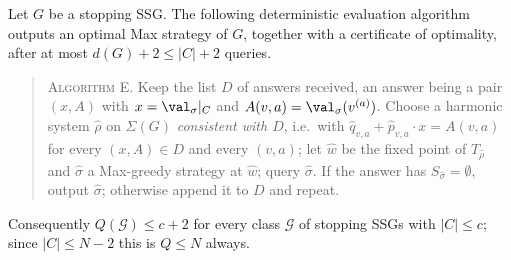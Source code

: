 \begin{theorem}\label{thm:qm-eval}
Let $G$ be a stopping SSG.  The following deterministic evaluation
algorithm outputs an optimal Max strategy of $G$, together with a
certificate of optimality, after at most $d(G)+2\le|C|+2$ queries.
\begin{quote}
\textsc{Algorithm E}.  Keep the list $D$ of answers received, an answer
being a pair $(x,A)$ with $x=\val_\sigma|_C$ and $A(v,a)=\val_\sigma(v^{(a)})$.
Choose a harmonic system $\hat\rho$ on $\Sigma(G)$ \emph{consistent with
$D$}, i.e.\ with $\hat q_{v,a}+\hat p_{v,a}\cdot x=A(v,a)$ for every
$(x,A)\in D$ and every $(v,a)$; let $\hat w$ be the fixed point of
$T_{\hat\rho}$ and $\hat\sigma$ a Max-greedy strategy at $\hat w$; query
$\hat\sigma$.  If the answer has $S_{\hat\sigma}=\emptyset$, output
$\hat\sigma$; otherwise append it to $D$ and repeat.
\end{quote}
Consequently $Q(\mathcal G)\le c+2$ for every class $\mathcal G$ of
stopping SSGs with $|C|\le c$; since $|C|\le N-2$ this is $Q\le N$ always.
\end{theorem}

